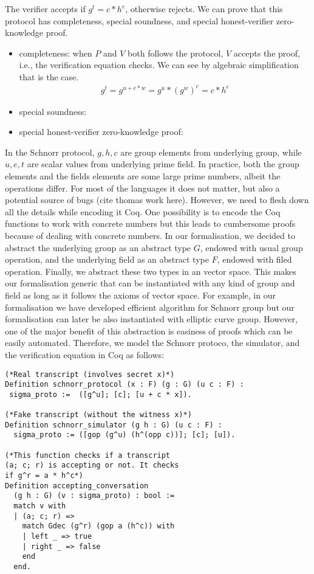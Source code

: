 \documentclass[conference,compsoc]{IEEEtran}
\begin{document}
The verifier accepts if $g^t = c * h^e$, otherwise rejects. We can prove that 
this protocol has completeness, special soundness, and special honest-verifier 
zero-knowledge proof. 


\begin{itemize}
  \item completeness: when $P$ and $V$ both follows the protocol, $V$ accepts the proof, i.e., 
  the verification equation checks. We can see by algebraic simplification that is the case.
    \begin{align*}
      g^t = g^{u + e * w} = g^u * (g^w)^e = c * h^e
    \end{align*}
  \item special soundness: 

  \item special honest-verifier zero-knowledge proof:
   
\end{itemize}


In the Schnorr protocol, $g, h, c$ are group elements from underlying group, while 
$u, e, t$ are scalar values from underlying prime field. In practice, 
both the group elements and the fields elements are some large prime numbers,
albeit the operations differ. For most of the languages it does not matter, 
but also a potential source of bugs (cite thomas work here). However, 
we need to flesh down all the details while encoding it Coq. One possibility is 
to encode the Coq functions to work with concrete numbers but this leads to 
cumbersome proofs because of dealing with concrete numbers. In our formalisation, 
we decided to abstract the underlying group as an abstract type $G$, endowed with 
usual group operation, and the underlying field as an abstract type $F$, endowed with 
filed operation. Finally, we abstract these two types in an vector space. This 
makes our formalisation generic that can be instantiated with 
any kind of group and field as long as it follows the axioms of 
vector space. For example, in our formalisation we have developed 
efficient algorithm for Schnorr group but our formalisation can 
later be also instantiated with elliptic curve group. However, 
one of the major benefit of this abstraction is easiness of proofs 
which can be easily automated. Therefore, we model the Schnorr 
protoco, the simulator, and the verification equation in Coq as follows: 
 
\begin{lstlisting}[language=Coq]
(*Real transcript (involves secret x)*)
Definition schnorr_protocol (x : F) (g : G) (u c : F) : 
 sigma_proto :=  ([g^u]; [c]; [u + c * x]).

(*Fake transcript (without the witness x)*)
Definition schnorr_simulator (g h : G) (u c : F) :
  sigma_proto := ([gop (g^u) (h^(opp c))]; [c]; [u]).

(*This function checks if a transcript 
(a; c; r) is accepting or not. It checks
if g^r = a * h^c*)
Definition accepting_conversation 
  (g h : G) (v : sigma_proto) : bool :=
  match v with
  | (a; c; r) =>  
    match Gdec (g^r) (gop a (h^c)) with 
    | left _ => true
    | right _ => false 
    end
  end.
\end{lstlisting}
  
\end{document}
